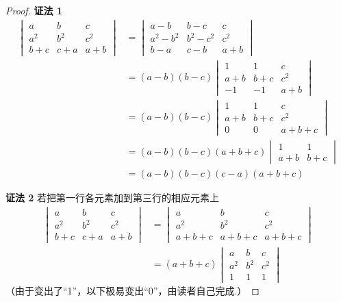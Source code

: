 \begin{proof}
  \textbf{证法 1}
\[\begin{split}
  \begin{vmatrix}a&b&c\\a^2&b^2&c^2\\b+c&c+a&a+b\end{vmatrix}&=\begin{vmatrix}a-b&b-c&c\\a^2-b^2&b^2-c^2&c^2\\b-a&c-b&a+b\end{vmatrix}\\
  &=(a-b)(b-c)\begin{vmatrix}1&1&c\\a+b&b+c&c^2\\-1&-1&a+b\end{vmatrix}\\
  &=(a-b)(b-c)\begin{vmatrix}1&1&c\\a+b&b+c&c^2\\0&0&a+b+c\end{vmatrix}\\
  &=(a-b)(b-c)(a+b+c)\begin{vmatrix}1&1\\a+b&b+c\end{vmatrix}\\
  &=(a-b)(b-c)(c-a)(a+b+c)
\end{split}  \]

\textbf{证法 2} 若把第一行各元素加到第三行的相应元素上
\[\begin{split}
  \begin{vmatrix}a&b&c\\a^2&b^2&c^2\\b+c&c+a&a+b\end{vmatrix}&=\begin{vmatrix}a&b&c\\a^2&b^2&c^2\\a+b+c&a+b+c&a+b+c\end{vmatrix}\\
  &=(a+b+c)\begin{vmatrix}
    a&b&c\\a^2&b^2&c^2\\
    1&1&1
  \end{vmatrix}
\end{split}\]
（由于变出了“1”，以下极易变出“0”，由读者自己完成.）
\end{proof}

